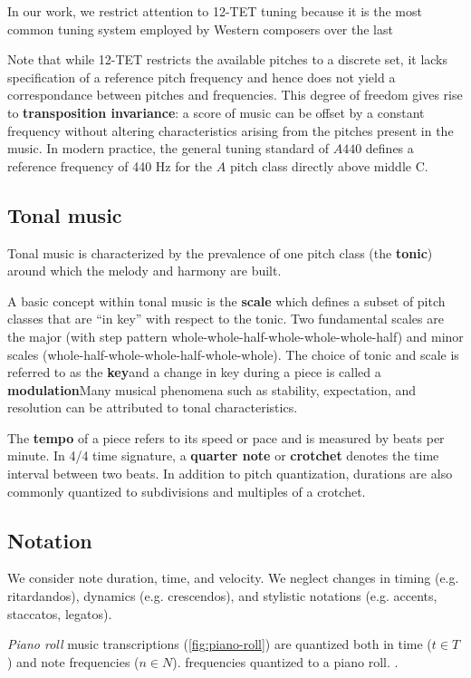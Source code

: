 In our work, we restrict attention to 12-TET tuning because it is the most
common tuning system employed by Western composers over the last 

Note that while 12-TET restricts the available pitches to a discrete set, it
lacks specification of a reference pitch frequency and hence does not yield a
correspondance between pitches and frequencies. This degree of freedom gives
rise to \textbf{transposition invariance}: a score of music can be offset by a
constant frequency without altering characteristics arising from the pitches
present in the music. In modern practice, the general tuning standard of $A440$
defines a reference frequency of 440 Hz for the $A$ pitch class directly above
middle C.

\subsection{Tonal music}

Tonal music is characterized by the prevalence of one pitch class (the
\textbf{tonic}) around which the melody and harmony are built.

A basic concept within tonal music is the \textbf{scale} which defines a subset
of pitch classes that are ``in key'' with respect to the tonic. Two fundamental
scales are the major (with step pattern
whole-whole-half-whole-whole-whole-half) and minor scales
(whole-half-whole-whole-half-whole-whole). The choice of tonic and scale is
referred to as the \textbf{key}and a change in key during a piece is called a
\textbf{modulation}Many musical phenomena such as stability, expectation, and
resolution can be attributed to tonal characteristics.

The \textbf{tempo} of a piece refers to its speed or pace and is measured by
beats per minute. In 4/4 time signature, a \textbf{quarter note} or
\textbf{crotchet} denotes the time interval between two beats. In addition to
pitch quantization, durations are also commonly quantized to subdivisions and
multiples of a crotchet.

\subsection{Notation}

We consider note duration, time, and velocity. We neglect changes in timing
(e.g. ritardandos), dynamics (e.g. crescendos), and stylistic notations (e.g.
accents, staccatos, legatos).


\emph{Piano roll} music transcriptions (\autoref{fig:piano-roll}) are quantized
both in time ($t \in T$) and note frequencies ($n \in N$). frequencies
quantized to a piano roll. .

